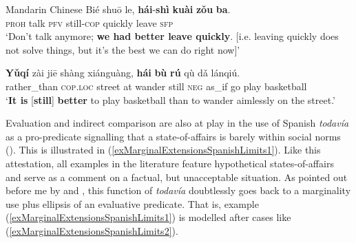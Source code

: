 \begin{exe}
	\ex \label{exMarginalExtensionsMandarin}
	\begin{xlist}
		\exi{}Mandarin Chinese
		\ex\label{exMarginalExtensionsMandarin1}
		\gll Bié	shuō	le,	\textbf{hái}-\textbf{shì}	\textbf{kuài}	\textbf{zǒu}	\textbf{ba}.\\
	\textsc{proh} talk \textsc{pfv} still-\textsc{cop} quickly leave \textsc{sfp}\\
	\glt \lq Don't talk anymore; \textbf{we had better leave quickly}. [i.e. leaving quickly does not solve things, but it's the best we can do right now]'
	\\\parencite[48]{Liu2000}
	
		\ex\label{exMarginalExtensionsMandarin2}
	\gll \textbf{Yǔqí}	zài	jiē	shàng	xiánguàng,	\textbf{hái}	\textbf{bù}	\textbf{rú}	qù	dǎ	lánqiú.\\
	rather\_than \textsc{cop}.\textsc{loc} street at wander still \textsc{neg} as\_if go play basketball\\
	\glt \lq \textbf{It is} [\textbf{still}] \textbf{better} to play basketball than to wander aimlessly on the street.' \parencite[28]{HuangShi2016}
\end{xlist}
\end{exe}

Evaluation and indirect comparison are also at play in the use of Spanish \textit{todavía} as a pro-predicate signalling that a state-of-affairs is barely within social norms (). This is illustrated in (\ref{exMarginalExtensionsSpanishLimits1}). Like this attestation, all examples in the literature feature hypothetical states-of-affairs and serve as a comment on a factual, but unacceptable situation. As pointed out before me by \textcite{Bosque2016} and \textcite{Deloor2012}, this function of \textit{todavía} doubtlessly goes back to a marginality use plus ellipsis of an evaluative predicate. That is, example (\ref{exMarginalExtensionsSpanishLimits1}) is modelled after cases like (\ref{exMarginalExtensionsSpanishLimits2}).

